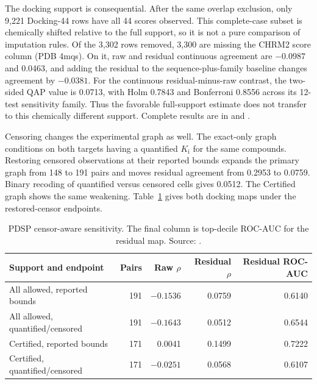 The docking support is consequential. After the same overlap exclusion, only 9{,}221 Docking-44
rows have all 44 scores observed. This complete-case subset is chemically shifted relative to
the full support, so it is not a pure comparison of imputation rules. Of the 3{,}302 rows removed,
3{,}300 are missing the CHRM2 score column (PDB 4mqs). On it, raw and residual
continuous agreement are $-0.0987$ and 0.0463, and adding the residual to the
sequence-plus-family baseline changes agreement by $-0.0381$. For the continuous
residual-minus-raw contrast, the two-sided QAP value is 0.0713, with Holm 0.7843 and Bonferroni
0.8556 across its 12-test sensitivity family. Thus the favorable full-support estimate does not
transfer to this chemically different support. Complete results are in
 and
.

Censoring changes the experimental graph as well. The exact-only graph conditions on both targets
having a quantified $K_\mathrm{i}$ for the same compounds. Restoring censored observations at
their reported bounds expands the primary graph from 148 to 191 pairs and moves residual
agreement from 0.2953 to 0.0759. Binary recoding of quantified versus censored cells gives 0.0512.
The Certified graph shows the same weakening. Table~\ref{tab:s6-pdsp-censor} gives both docking
maps under the restored-censor endpoints.

\begin{table}[htbp]
\centering
\small
\setlength{\tabcolsep}{5pt}
\caption[PDSP censor-aware sensitivity]{PDSP censor-aware sensitivity. The final column is
top-decile ROC-AUC for the residual map. Source:
.}
\label{tab:s6-pdsp-censor}
\begin{tabular}{lrrrr}
\toprule
Support and endpoint & Pairs & Raw $\rho$ & Residual $\rho$ & Residual ROC-AUC \\
\midrule
All allowed, reported bounds & 191 & $-0.1536$ & 0.0759 & 0.6140 \\
All allowed, quantified/censored & 191 & $-0.1643$ & 0.0512 & 0.6544 \\
Certified, reported bounds & 171 & 0.0041 & 0.1499 & 0.7222 \\
Certified, quantified/censored & 171 & $-0.0251$ & 0.0568 & 0.6107 \\
\bottomrule
\end{tabular}
\end{table}

